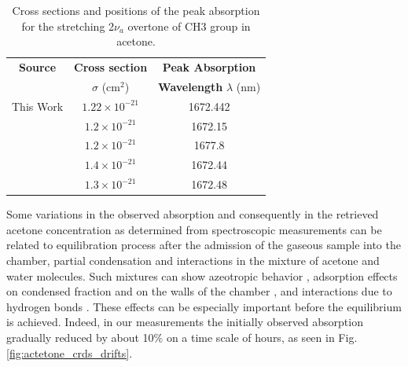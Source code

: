 \documentclass[8pt,a4paper]{report}
\begin{document}
	\begin{table}[H]
		\caption{ Cross sections and positions of the peak absorption for the stretching 2$\nu_a$ overtone of CH3 group in acetone.}
		\begin{center}
			\begin{tabular}{|c|c|c|}
				\hline
				\textbf{Source} & \textbf{Cross section} & \textbf{Peak Absorption} \\
				& $\sigma$ (cm$^2$) &\textbf{Wavelength} $\lambda$ (nm) \\
				\hline
				This Work \cite{mine_acetone} & $1.22\times10^{-21}$ & 1672.442 \\
				\hline
				\cite{Pearle_2008} & $1.2\times 10^{-21}$ & 1672.15 \\
				\hline
				\cite{Wang_2004} & $1.2\times 10^{-21}$ & 1677.8 \\
				\hline
				\cite{pnnl_database_gas_phase} & $1.4\times 10^{-21}$ & 1672.44 \\
				\hline
				\cite{Denzer_2010} & $1.3\times 10^{-21}$ & 1672.48 \\
				\hline
			\end{tabular}
		\end{center}
		\label{tbl:compare_lit}
	\end{table}
	
	Some variations in the observed absorption and consequently in the retrieved acetone concentration as determined from spectroscopic measurements can be related to equilibration process after the admission of the gaseous sample into the chamber, partial condensation and interactions in the mixture of acetone and water molecules. Such mixtures can show azeotropic behavior \cite{Mahdi_azeotrope}, adsorption effects on condensed fraction and on the walls of the chamber \cite{Duan_1993, CHEN_2001}, and interactions due to hydrogen bonds \cite{COUTINHO_1999, Jean-Joseph_2003, Jean-Joseph_2003_molModels}. These effects can be especially important before the equilibrium is achieved. Indeed, in our measurements the initially observed absorption gradually reduced by about 10\% on a time scale of hours, as seen in Fig. \ref{fig:actetone_crds_drifts}.
	
\end{document}
